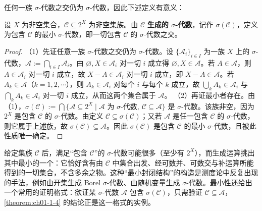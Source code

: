 \documentclass[../../main.tex]{subfiles}
\begin{document}
任何一族 $\sigma$-代数之交仍为 $\sigma$-代数，因此下述定义有意义：

\begin{definition}\label{definition:ch01-1-5}
设 $X$ 为非空集合，$\mathcal{C}\subseteq2^{X}$ 为非空集族。由 $\mathcal{C}$ \textbf{生成的 $\sigma$-代数}，记作 $\sigma(\mathcal{C})$，定义为包含 $\mathcal{C}$ 的最小 $\sigma$-代数，即一切包含 $\mathcal{C}$ 的 $\sigma$-代数之交。
\end{definition}

\begin{proof}
（1）先证任意一族 $\sigma$-代数之交仍为 $\sigma$-代数。设 $\{\mathcal{A}_{i}\}_{i\in I}$ 为一族 $X$ 上的 $\sigma$-代数，$\mathcal{A}:=\bigcap_{i\in I}\mathcal{A}_{i}$。由 $\varnothing,X\in\mathcal{A}_{i}$ 对一切 $i$ 成立得 $\varnothing,X\in\mathcal{A}$。若 $A\in\mathcal{A}$，则 $A\in\mathcal{A}_{i}$ 对一切 $i$ 成立，故 $X-A\in\mathcal{A}_{i}$ 对一切 $i$ 成立，即 $X-A\in\mathcal{A}$。若 $A_{k}\in\mathcal{A}$（$k=1,2,\cdots$），则 $A_{k}\in\mathcal{A}_{i}$ 对每个 $i$ 与每个 $k$ 成立，故 $\bigcup_{k}A_{k}\in\mathcal{A}_{i}$ 与 $\bigcap_{k}A_{k}\in\mathcal{A}_{i}$ 对一切 $i$ 成立，从而这两个集合属于 $\mathcal{A}$。
（2）再证最小者存在。由（1），$\sigma(\mathcal{C}):=\bigcap\{\mathcal{A}\subseteq2^{X}\mid\mathcal{A}\text{ 为 }\sigma\text{-代数},\ \mathcal{C}\subseteq\mathcal{A}\}$ 是 $\sigma$-代数。该族非空，因为 $2^{X}$ 是包含 $\mathcal{C}$ 的 $\sigma$-代数。由定义 $\mathcal{C}\subseteq\sigma(\mathcal{C})$；又若 $\mathcal{A}$ 是任一包含 $\mathcal{C}$ 的 $\sigma$-代数，则它属于上述族，故 $\sigma(\mathcal{C})\subseteq\mathcal{A}$。因此 $\sigma(\mathcal{C})$ 是包含 $\mathcal{C}$ 的最小 $\sigma$-代数，且被此性质唯一确定。
\end{proof}

\begin{remark}\label{remark:ch01-def-1-5-生成动机}
给定集族 $\mathcal{C}$ 后，满足“包含 $\mathcal{C}$”的 $\sigma$-代数可能很多（至少有 $2^{X}$），而生成运算挑出其中最小的一个：它恰好含有由 $\mathcal{C}$ 中集合出发、经可数并、可数交与补运算所能得到的一切集合，不含多余之物。这种“最小封闭结构”的构造是测度论中反复出现的手法，例如由开集生成 Borel $\sigma$-代数、由随机变量生成 $\sigma$-代数。最小性还给出一个常用的证明格式：欲证某 $\sigma$-代数 $\mathcal{A}$ 包含 $\sigma(\mathcal{C})$，只需验证 $\mathcal{C}\subseteq\mathcal{A}$，\cref{theorem:ch01-1-4} 的结论正是这一格式的实例。%
\end{remark}
\end{document}
